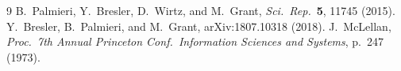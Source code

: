 \documentclass[11pt]{article}
\begin{document}

\begin{thebibliography}{9}
 B.~Palmieri, Y.~Bresler, D.~Wirtz, and M.~Grant, \textit{Sci.\ Rep.}\ \textbf{5}, 11745 (2015).
 Y.~Bresler, B.~Palmieri, and M.~Grant, arXiv:1807.10318 (2018).
 J.~McLellan, \textit{Proc.\ 7th Annual Princeton Conf.\ Information Sciences and Systems}, p.~247 (1973).
\end{thebibliography}
\end{document}
